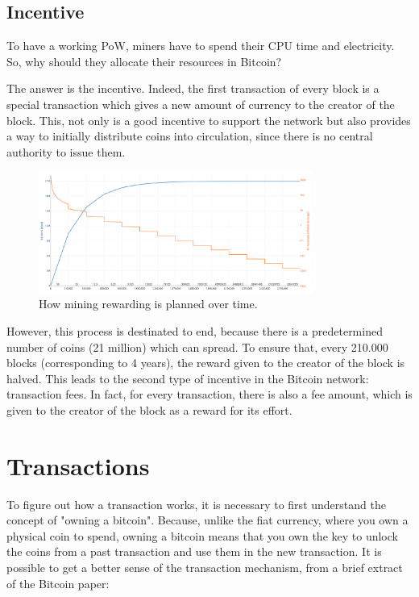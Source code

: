 \subsection{Incentive}
\label{sec:incentive}

To have a working PoW, miners have to spend their CPU time and electricity. So, why 
should they allocate their resources in Bitcoin?

The answer is the incentive. Indeed, the first transaction of every block is a special
transaction which gives a new amount of currency to the creator of the block. This, 
not only is a good incentive to support the network but also provides a way to initially 
distribute coins into circulation, since there is no central authority to issue them.
\begin{figure}[!h]
    \centering
    \includegraphics[width = 0.8\textwidth]{rewarding.png}
    \caption{How mining rewarding is planned over time.\cite{rewarding}}
    \label{fig:claim}
\end{figure} 
However, this process is destinated to end, because there is a predetermined number
of coins (21 million) which can spread. To ensure that, every 210.000 blocks 
(corresponding to 4 years), the reward given to the creator of the block is halved.
This leads to the second type of incentive in the Bitcoin network: transaction fees.
In fact, for every transaction, there is also a fee amount, which is given to the 
creator of the block as a reward for its effort.




\section{Transactions}
\label{sec:transactions}

To figure out how a transaction works, it is necessary to first understand the concept of
"owning a bitcoin". Because, unlike the fiat currency, where you own a physical coin
to spend, owning a bitcoin means that you own the key to unlock the coins from a past
transaction and use them in the new transaction. It is possible to get a better sense of the 
transaction mechanism, from a brief extract of the Bitcoin paper: 

